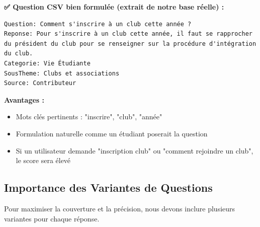 \documentclass[11pt,a4paper]{article}
\begin{document}
\begin{exemple}

\textbf{✅ Question CSV bien formulée (extrait de notre base réelle) :}

\begin{lstlisting}
Question: Comment s'inscrire à un club cette année ?
Reponse: Pour s'inscrire à un club cette année, il faut se rapprocher du président du club pour se renseigner sur la procédure d'intégration du club.
Categorie: Vie Étudiante
SousTheme: Clubs et associations
Source: Contributeur
\end{lstlisting}

\textbf{Avantages :}
\begin{itemize}
    \item Mots clés pertinents : "inscrire", "club", "année"
    \item Formulation naturelle comme un étudiant poserait la question
    \item Si un utilisateur demande "inscription club" ou "comment rejoindre un club", le score sera élevé
\end{itemize}
\end{exemple}

\clearpage

\subsection{Importance des Variantes de Questions}

Pour maximiser la couverture et la précision, nous devons inclure plusieurs variantes pour chaque réponse.
\end{document}
